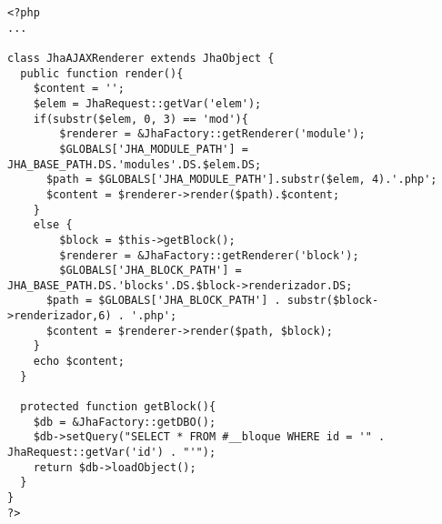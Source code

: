\begin{lstlisting}[label=jha_renderer_head,caption=Renderizador para el tag HTML `head'.]
<?php
...

class JhaAJAXRenderer extends JhaObject {
  public function render(){
    $content = '';
    $elem = JhaRequest::getVar('elem');
    if(substr($elem, 0, 3) == 'mod'){
    	$renderer = &JhaFactory::getRenderer('module');
    	$GLOBALS['JHA_MODULE_PATH'] = JHA_BASE_PATH.DS.'modules'.DS.$elem.DS;
      $path = $GLOBALS['JHA_MODULE_PATH'].substr($elem, 4).'.php';
      $content = $renderer->render($path).$content;
    }
    else {
    	$block = $this->getBlock();
    	$renderer = &JhaFactory::getRenderer('block');
    	$GLOBALS['JHA_BLOCK_PATH'] = JHA_BASE_PATH.DS.'blocks'.DS.$block->renderizador.DS;
      $path = $GLOBALS['JHA_BLOCK_PATH'] . substr($block->renderizador,6) . '.php';
      $content = $renderer->render($path, $block);
    }
    echo $content;
  }
  
  protected function getBlock(){
  	$db = &JhaFactory::getDBO();
    $db->setQuery("SELECT * FROM #__bloque WHERE id = '" . JhaRequest::getVar('id') . "'");
    return $db->loadObject();
  }
}
?>
\end{lstlisting}
